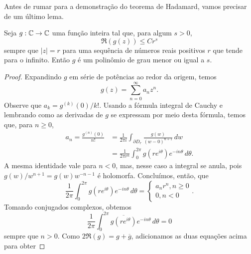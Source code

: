     Antes de rumar para a demonstração do teorema de Hadamard, vamos precisar de um último
    lema.
    \begin{lema}
    \label{lema:5.5-Stein}
        Seja $g:\mathbb{C}\to\mathbb{C}$ uma função inteira tal que, para algum $s>0$,
        \begin{equation*}
            \Re(g(z)) \leq C r^s
        \end{equation*}
        sempre que $|z| = r$ para uma sequência de números reais positivos $r$ que tende para o infinito.
        Então $g$ é um polinômio de grau menor ou igual a $s$.
    \end{lema}
    \begin{proof}
        Expandindo $g$ em série de potências ao redor da origem, temos
        \begin{equation*}
            g(z) = \sum_{n=0}^{\infty} a_n z^n.
        \end{equation*}
        Observe que $a_k = g^{(k)}(0)/k!$. Usando a fórmula integral de Cauchy e lembrando como as derivadas de $g$ se expressam por meio desta fórmula, temos que, para $n \geq 0$,
        \begin{align*}
            a_n = \frac{g^{(n)}(0)}{n!} &= \frac{1}{2\pi i} \int_{\partial D_r} \frac{g(w)}{(w - 0)^{n+1}} \, dw \\
            &= \frac{1}{2\pi r^n} \int_{0}^{2\pi} g(re^{i\theta})e^{-in\theta} \, d\theta.
        \end{align*}
        A mesma identidade vale para $n < 0$, mas, nesse caso a integral se anula, pois $g(w)/w^{n+1} = g(w)w^{-n-1}$ é holomorfa. Concluímos, então, que
        \begin{equation*}
            \frac{1}{2\pi} \int_0^{2\pi} g(re^{i\theta}) e^{-in\theta} \, d\theta
            =
            \begin{cases}
                a_n r^n, n \geq 0 \\
                0, n < 0
            \end{cases}.
        \end{equation*}
        Tomando conjugados complexos, obtemos
        \begin{equation*}
            \frac{1}{2\pi} \int_0^{2\pi} \overline{ g(re^{i\theta}) } e^{-in\theta} \, d\theta = 0
        \end{equation*}
        sempre que $n > 0$. Como $2\Re(g) = g + \overline{g}$, adicionamos as duas equações
        acima para obter

\end{proof}

